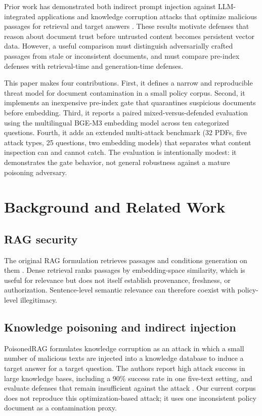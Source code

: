 \documentclass[conference]{IEEEtran}
\begin{document}
Prior work has demonstrated both indirect prompt injection against LLM-integrated applications \cite{greshake2023indirect} and knowledge corruption attacks that optimize malicious passages for retrieval and target answers \cite{zou2024poisonedrag}. These results motivate defenses that reason about document trust before untrusted content becomes persistent vector data. However, a useful comparison must distinguish adversarially crafted passages from stale or inconsistent documents, and must compare pre-index defenses with retrieval-time and generation-time defenses.

This paper makes four contributions. First, it defines a narrow and reproducible threat model for document contamination in a small policy corpus. Second, it implements an inexpensive pre-index gate that quarantines suspicious documents before embedding. Third, it reports a paired mixed-versus-defended evaluation using the multilingual BGE-M3 embedding model across ten categorized questions. Fourth, it adds an extended multi-attack benchmark (32 PDFs, five attack types, 25 questions, two embedding models) that separates what content inspection can and cannot catch. The evaluation is intentionally modest: it demonstrates the gate behavior, not general robustness against a mature poisoning adversary.

\section{Background and Related Work}
\subsection{RAG security}
The original RAG formulation retrieves passages and conditions generation on them \cite{lewis2020rag}. Dense retrieval ranks passages by embedding-space similarity, which is useful for relevance but does not itself establish provenance, freshness, or authorization. Sentence-level semantic relevance can therefore coexist with policy-level illegitimacy.

\subsection{Knowledge poisoning and indirect injection}
PoisonedRAG formulates knowledge corruption as an attack in which a small number of malicious texts are injected into a knowledge database to induce a target answer for a target question. The authors report high attack success in large knowledge bases, including a 90\% success rate in one five-text setting, and evaluate defenses that remain insufficient against the attack \cite{zou2024poisonedrag}. Our current corpus does not reproduce this optimization-based attack; it uses one inconsistent policy document as a contamination proxy.
\end{document}
